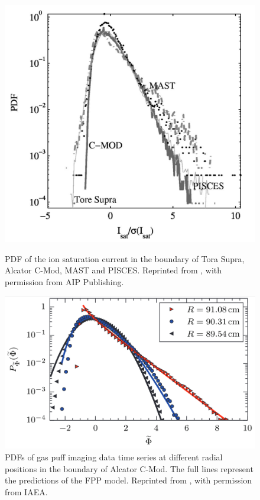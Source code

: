 \begin{figure}
	\centering
	\begin{minipage}{.48\linewidth}
		\includegraphics[width=\linewidth]{figures/antar.png}
		\caption{PDF of the ion saturation current in the boundary of Tora Supra, Alcator C-Mod, MAST and PISCES. Reprinted from \cite{antar2003universality}, with permission from AIP Publishing.}
		\label{Fig:antar}
	\end{minipage}
	\hfill
	\begin{minipage}{.48\linewidth}
		\includegraphics[width=\linewidth]{figures/theodorsen_pdf.png}
		\caption{PDFs of gas puff imaging data time series at different radial positions in the boundary of Alcator C-Mod. The full lines represent the predictions of the FPP model. Reprinted from \cite{theodorsen2017relationship}, with permission from IAEA.}
		\label{Fig:theodorsen_pdf}
	\end{minipage}
\end{figure}

